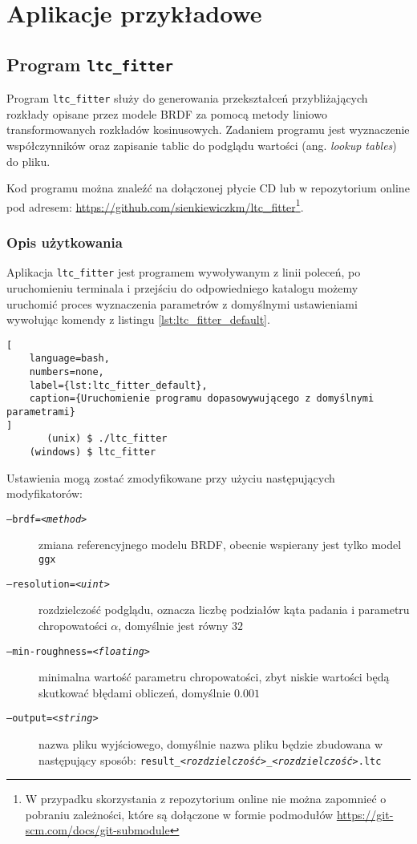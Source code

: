 \documentclass[../main.tex]{subfiles}
\begin{document}
\chapter{Aplikacje przykładowe}

\section{Program \texttt{ltc\_fitter}}

Program \texttt{ltc\_fitter} służy do generowania przekształceń przybliżających rozkłady opisane przez modele BRDF za pomocą metody liniowo transformowanych rozkładów kosinusowych. Zadaniem programu jest wyznaczenie współczynników oraz zapisanie tablic do podglądu wartości (ang. \textit{lookup tables}) do pliku.

Kod programu można znaleźć na dołączonej płycie CD lub w repozytorium online pod adresem: \url{https://github.com/sienkiewiczkm/ltc_fitter}\footnote{W przypadku skorzystania z repozytorium online nie można zapomnieć o pobraniu zależności, które są dołączone w formie podmodułów \url{https://git-scm.com/docs/git-submodule}}.

\subsection{Opis użytkowania}

Aplikacja \texttt{ltc\_fitter} jest programem wywoływanym z linii poleceń, po uruchomieniu terminala i przejściu do odpowiedniego katalogu możemy uruchomić proces wyznaczenia parametrów z domyślnymi ustawieniami wywołując komendy z listingu \ref{lst:ltc_fitter_default}.

\begin{lstlisting}[
    language=bash,
    numbers=none,
    label={lst:ltc_fitter_default},
    caption={Uruchomienie programu dopasowywującego z domyślnymi parametrami}
]
       (unix) $ ./ltc_fitter
    (windows) $ ltc_fitter
\end{lstlisting}

Ustawienia mogą zostać zmodyfikowane przy użyciu następujących modyfikatorów:
\begin{description}
    \item[\texttt{--brdf=\textit{<method>}}] zmiana referencyjnego modelu BRDF, obecnie wspierany jest tylko model \texttt{ggx}
    
    \item[\texttt{--resolution=\textit{<uint>}}] rozdzielczość podglądu, oznacza liczbę podziałów kąta padania i parametru chropowatości $\alpha$, domyślnie jest równy $32$
    
    \item[\texttt{--min-roughness=\textit{<floating>}}] minimalna wartość parametru chropowatości, zbyt niskie wartości będą skutkować błędami obliczeń, domyślnie $0.001$
    
    \item[\texttt{--output=\textit{<string>}}] nazwa pliku wyjściowego, domyślnie nazwa pliku będzie zbudowana w następujący sposób: \texttt{result\_\textit{<rozdzielczość>}\_\textit{<rozdzielczość>}.ltc}
\end{description}
\end{document}
